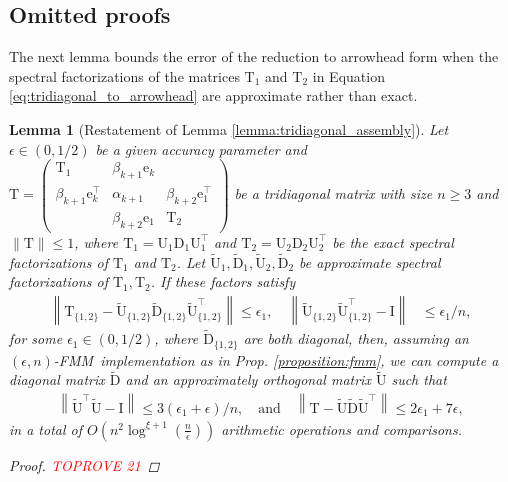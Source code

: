 \documentclass{article}
\newcommand{\lnorm}{\left\|}
\newcommand{\rnorm}{\right\|}
\newcommand{\lpar}{\left(}
\newcommand{\rpar}{\right)}
\newtheorem{lemma}{Lemma}[section]
\newcommand\vece{\boldsymbol{\mathrm{e}}}
\newcommand\matD{\boldsymbol{\mathrm{D}}}
\newcommand\matI{\boldsymbol{\mathrm{I}}}
\newcommand\matT{\boldsymbol{\mathrm{T}}}
\newcommand\matU{\boldsymbol{\mathrm{U}}}
\newcommand\matDtilde{\widetilde{\boldsymbol{\mathrm{D}}}}
\newcommand\matUtilde{\widetilde{\boldsymbol{\mathrm{U}}}}
\newcommand{\cfmm}{\xi}
\newcommand{\fmmalgo}{FMM} \usepackage[utf8]{inputenc}
\begin{document}
\subsection{Omitted proofs}
The next lemma bounds the error of the reduction to arrowhead form when the spectral factorizations of the matrices $\matT_1$ and $\matT_2$ in Equation \eqref{eq:tridiagonal_to_arrowhead} are approximate rather than exact.
\begin{lemma}[Restatement of Lemma \ref{lemma:tridiagonal_assembly}]
\label{lemma:tridiagonal_assembly_appendix}
Let $\epsilon\in(0,1/2)$ be a given accuracy parameter and $\matT = \begin{pmatrix}
    \matT_1 & \beta_{k+1}\vece_k & \\
    \beta_{k+1}\vece_k^\top & \alpha_{k+1} & \beta_{k+2}\vece_1^\top \\
     & \beta_{k+2}\vece_1 & \matT_2
\end{pmatrix}$ be a tridiagonal matrix with size  $n\geq 3$ and $\|\matT\|\leq 1$, where $\matT_1=\matU_1\matD_1\matU_1^\top$ and $\matT_2=\matU_2\matD_2\matU_2^\top$ be the exact spectral factorizations of $\matT_1$ and $\matT_2$. Let $\matUtilde_1,\matDtilde_1,\matUtilde_2,\matDtilde_2$ be approximate spectral factorizations of $\matT_1,\matT_2$. If these factors satisfy
    \begin{align*}
        \lnorm
            \matT_{\{1,2\}} - \matUtilde_{\{1,2\}}\matDtilde_{\{1,2\}}\matUtilde_{\{1,2\}}^\top
        \rnorm 
        \leq \epsilon_1,
        \quad
        \lnorm \matUtilde_{\{1,2\}}\matUtilde_{\{1,2\}}^\top -\matI \rnorm &\leq \epsilon_1/n,
    \end{align*}
    for some $\epsilon_1\in(0,1/2)$, where $\matDtilde_{\{1,2\}}$ are both diagonal, then, assuming an $(\epsilon,n)$-\fmmalgo\   implementation as in Prop. \ref{proposition:fmm}, we can compute a diagonal matrix $\matDtilde$ and an approximately orthogonal matrix $\matUtilde$ such that
    \begin{align*}
        \lnorm\matUtilde^\top\matUtilde-\matI\rnorm\leq 3(\epsilon_1+\epsilon)/n,
        \quad \text{and} \quad
        \lnorm 
            \matT-\matUtilde\matDtilde\matUtilde^\top
        \rnorm \leq 2\epsilon_1+7\epsilon,
    \end{align*}
    in a total of $O\lpar n^2\log^{\cfmm+1}(\tfrac{n}{\epsilon})\rpar$ arithmetic operations and comparisons.
    \begin{proof}\textcolor{red}{TOPROVE 21}\end{proof}
\end{lemma}
\end{document}
